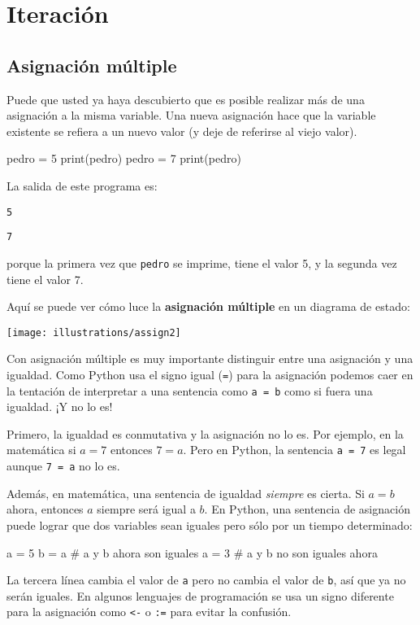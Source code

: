 
\chapter{Iteración }


\section{Asignación múltiple}

  

Puede que usted ya haya descubierto que es posible realizar más de
una asignación a la misma variable. Una nueva asignación hace que
la variable existente se refiera a un nuevo valor (y deje de referirse
al viejo valor).

\begin{pythoncode}
pedro = 5
print(pedro)
pedro = 7
print(pedro)
\end{pythoncode}
 La salida de este programa es:

\texttt{5 }

\texttt{7} 

porque la primera vez que \texttt{pedro} se imprime, tiene el valor
5, y la segunda vez tiene el valor 7.

Aquí se puede ver cómo luce la \textbf{asignación múltiple } en un
diagrama de estado:

\beforefig \centerline{\texttt{[image: illustrations/assign2]}}
\afterfig

Con asignación múltiple es muy importante distinguir entre una asignación
y una igualdad. Como Python usa el signo igual (\texttt{=}) para la
asignación podemos caer en la tentación de interpretar a una sentencia
como \texttt{a = b} como si fuera una igualdad. ¡Y no lo es!

Primero, la igualdad es conmutativa y la asignación no lo es. Por
ejemplo, en la matemática si $a=7$ entonces $7=a$. Pero en Python,
la sentencia \texttt{a = 7} es legal aunque \texttt{7 = a} no lo es.

Además, en matemática, una sentencia de igualdad \textit{siempre}
es cierta. Si $a=b$ ahora, entonces $a$ siempre será igual a $b$.
En Python, una sentencia de asignación puede lograr que dos variables
sean iguales pero sólo por un tiempo determinado:

\begin{pythoncode}
a = 5
b = a    # a y b ahora son iguales
a = 3    # a y b no son iguales ahora
\end{pythoncode}
 La tercera línea cambia el valor de \texttt{a} pero no cambia el
valor de \texttt{b}, así que ya no serán iguales. En algunos lenguajes
de programación se usa un signo diferente para la asignación como
\texttt{<-} o \texttt{:=} para evitar la confusión.


